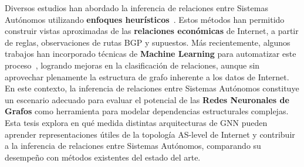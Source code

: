 Diversos estudios han abordado la inferencia de relaciones entre Sistemas Autónomos 
utilizando \textbf{enfoques heurísticos}~\cite{ASRank,Inferring-Multilateral-Peering,ProbLink,topoScopePaper}. 
Estos métodos han permitido construir vistas aproximadas de las \textbf{relaciones económicas} 
de Internet, a partir de reglas, observaciones de rutas BGP y supuestos. 
Más recientemente, algunos trabajos han incorporado técnicas de 
\textbf{Machine Learning} para automatizar este 
proceso~\cite{UnveilingtheTypeRelationshipBetweenAutonomousSystemsUsingDeepLearning}, 
logrando mejoras en la clasificación de relaciones, aunque sin aprovechar plenamente la 
estructura de grafo inherente a los datos de Internet.\\


En este contexto, la inferencia de relaciones entre Sistemas Autónomos constituye 
un escenario adecuado para evaluar el potencial de las \textbf{Redes Neuronales de Grafos} 
como herramienta para modelar dependencias estructurales complejas. Esta tesis explora en 
qué medida distintas arquitecturas de GNN pueden aprender representaciones útiles de la 
topología AS-level de Internet y contribuir a la inferencia de relaciones entre Sistemas 
Autónomos, comparando su desempeño con métodos existentes del estado del arte.\\


